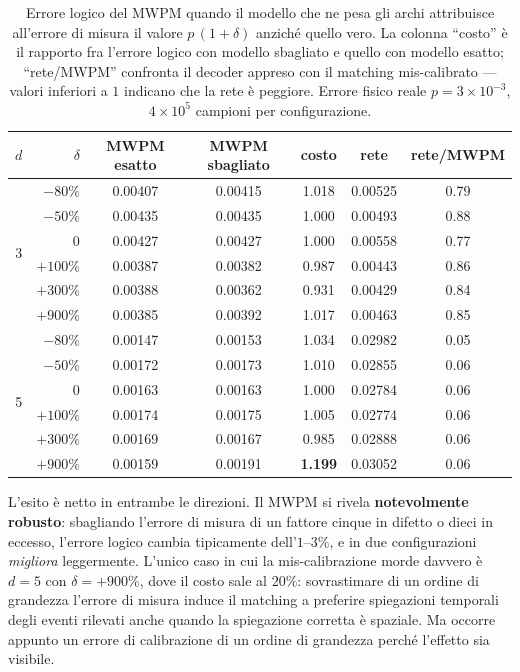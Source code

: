 \begin{table}[H]
\centering
\scriptsize
\begin{tabular}{crccccc}
\toprule
$d$ & $\delta$ & \textbf{MWPM esatto} & \textbf{MWPM sbagliato} & \textbf{costo} & \textbf{rete} & \textbf{rete/MWPM} \\
\midrule
\multirow{6}{*}{3} & $-80\%$  & 0.00407 & 0.00415 & 1.018 & 0.00525 & 0.79 \\
                   & $-50\%$  & 0.00435 & 0.00435 & 1.000 & 0.00493 & 0.88 \\
                   & $0$      & 0.00427 & 0.00427 & 1.000 & 0.00558 & 0.77 \\
                   & $+100\%$ & 0.00387 & 0.00382 & 0.987 & 0.00443 & 0.86 \\
                   & $+300\%$ & 0.00388 & 0.00362 & 0.931 & 0.00429 & 0.84 \\
                   & $+900\%$ & 0.00385 & 0.00392 & 1.017 & 0.00463 & 0.85 \\
\midrule
\multirow{6}{*}{5} & $-80\%$  & 0.00147 & 0.00153 & 1.034 & 0.02982 & 0.05 \\
                   & $-50\%$  & 0.00172 & 0.00173 & 1.010 & 0.02855 & 0.06 \\
                   & $0$      & 0.00163 & 0.00163 & 1.000 & 0.02784 & 0.06 \\
                   & $+100\%$ & 0.00174 & 0.00175 & 1.005 & 0.02774 & 0.06 \\
                   & $+300\%$ & 0.00169 & 0.00167 & 0.985 & 0.02888 & 0.06 \\
                   & $+900\%$ & 0.00159 & 0.00191 & \textbf{1.199} & 0.03052 & 0.06 \\
\bottomrule
\end{tabular}
\caption[Effetto di un modello di rumore mis-calibrato sul MWPM]{Errore logico del \ac{MWPM} quando il modello che ne pesa gli archi attribuisce all'errore di misura il valore $p\,(1+\delta)$ anziché quello vero. La colonna ``costo'' è il rapporto fra l'errore logico con modello sbagliato e quello con modello esatto; ``rete/MWPM'' confronta il decoder appreso con il matching mis-calibrato --- valori inferiori a $1$ indicano che la rete è peggiore. Errore fisico reale $p = 3\times10^{-3}$, $4\times10^{5}$ campioni per configurazione.}
\label{tab:neural_miscalibrato}
\end{table}

L'esito è netto in entrambe le direzioni. Il \ac{MWPM} si rivela \textbf{notevolmente robusto}: sbagliando l'errore di misura di un fattore cinque in difetto o dieci in eccesso, l'errore logico cambia tipicamente dell'$1$--$3\%$, e in due configurazioni \emph{migliora} leggermente. L'unico caso in cui la mis-calibrazione morde davvero è $d=5$ con $\delta = +900\%$, dove il costo sale al $20\%$: sovrastimare di un ordine di grandezza l'errore di misura induce il matching a preferire spiegazioni temporali degli eventi rilevati anche quando la spiegazione corretta è spaziale. Ma occorre appunto un errore di calibrazione di un ordine di grandezza perché l'effetto sia visibile.

